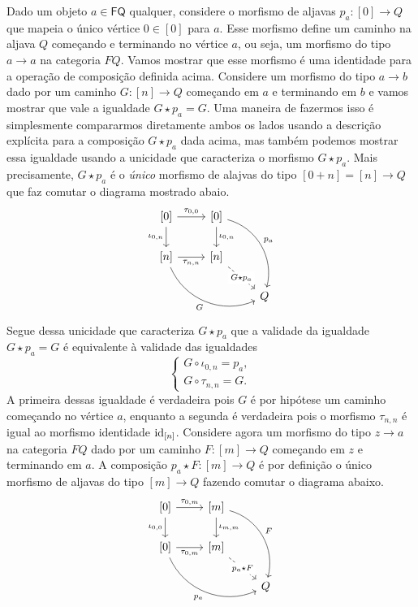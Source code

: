 Dado um objeto $a \in \mathsf{FQ}$ qualquer, considere o morfismo de aljavas $p_a: [0] \to Q$ que mapeia o único vértice $0 \in [0]$ para $a$.
Esse morfismo define um caminho na aljava $Q$ começando e terminando no vértice $a$, ou seja, um morfismo do tipo $a \to a$ na categoria $FQ$.
Vamos mostrar que esse morfismo é uma identidade para a operação de composição definida acima.
Considere um morfismo do tipo $a \to b$ dado por um caminho $G:[n] \to Q$ começando em $a$ e terminando em $b$ e vamos mostrar que vale a igualdade $G \star p_a = G$.
Uma maneira de fazermos isso é simplesmente compararmos diretamente ambos os lados usando a descrição explícita para a composição $G \star p_a$ dada acima, mas também podemos mostrar essa igualdade usando a unicidade que caracteriza o morfismo $G \star p_a$.
Mais precisamente, $G \star p_a$ é o \emph{único} morfismo de alajvas do tipo $[0+n] = [n] \to Q$ que faz comutar o diagrama mostrado abaio.
\begin{displaymath}
    \begin{tikzcd}
        {[0]}
        \arrow[r, "{\tau_{0,0}}"]
        \arrow[d, "{\iota_{0,n}}" swap]
        & {[0]}
        \arrow[d, "\iota_{0,n}"]
        \arrow[rdd, bend left=45, "p_a"]
        \\ {[n]}
        \arrow[r, "{\tau_{n,n}}" swap]
        \arrow[rrd, bend right=45, "G" swap]
        & {[n]}
        \arrow[rd, dashed, "G \star p_a" description]
        \\ & & Q
    \end{tikzcd}
\end{displaymath}
Segue dessa unicidade que caracteriza $G \star p_a$ que a validade da igualdade $G \star p_a = G$ é equivalente à validade das igualdades
\begin{displaymath}
    \begin{cases}
        G \circ \iota_{0,n} = p_a, \\
        G \circ \tau_{n,n} = G.
    \end{cases}
\end{displaymath}
A primeira dessas igualdade é verdadeira pois $G$ é por hipótese um caminho começando no vértice $a$, enquanto a segunda é verdadeira pois o morfismo $\tau_{n,n}$ é igual ao morfismo identidade $\mathrm{id}_{[n]}$.
Considere agora um morfismo do tipo $z \to a$ na categoria $FQ$ dado por um caminho $F:[m] \to Q$ começando em $z$ e terminando em $a$.
A composição $p_a \star F: [m] \to Q$ é por definição o único morfismo de aljavas do tipo $[m] \to Q$ fazendo comutar o diagrama abaixo.
\begin{displaymath}
    \begin{tikzcd}
        {[0]}
        \arrow[r, "{\tau_{0,m}}"]
        \arrow[d, "{\iota_{0,0}}" swap]
        & {[m]}
        \arrow[d, "\iota_{m,m}"]
        \arrow[rdd, bend left=45, "F"]
        \\ {[0]}
        \arrow[r, "{\tau_{0,m}}" swap]
        \arrow[rrd, bend right=45, "p_a" swap]
        & {[m]}
        \arrow[rd, dashed, "p_a \star F" description]
        \\ & & Q
    \end{tikzcd}
\end{displaymath}
